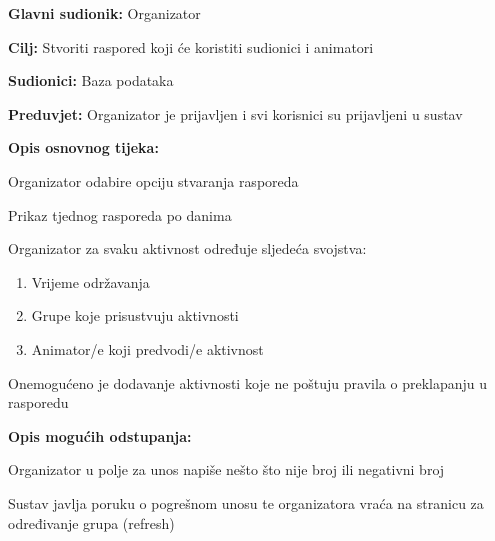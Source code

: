 \noindent {}
\begin{packed_item}

	\item \textbf{Glavni sudionik: }Organizator
	\item  \textbf{Cilj:} Stvoriti raspored koji će koristiti sudionici i animatori
	\item  \textbf{Sudionici:} Baza podataka
	\item  \textbf{Preduvjet:} Organizator je prijavljen i svi korisnici su prijavljeni u sustav
	\item  \textbf{Opis osnovnog tijeka:}

	\item[] \begin{packed_enum}

				\item Organizator odabire opciju stvaranja rasporeda
				\item Prikaz tjednog rasporeda po danima
				\item Organizator za svaku aktivnost određuje sljedeća svojstva:

				\begin{enumerate}
					\item Vrijeme održavanja
					\item Grupe koje prisustvuju aktivnosti
					\item Animator/e koji predvodi/e aktivnost
				\end{enumerate}
				\item Onemogućeno je dodavanje aktivnosti koje ne poštuju pravila o preklapanju u rasporedu

	\end{packed_enum}

	\item  \textbf{Opis mogućih odstupanja:}

	\item[] \begin{packed_item}

				\item[2.a] Organizator u polje za unos napiše nešto što nije broj ili negativni broj
				\item[] \begin{packed_enum}

							\item Sustav javlja poruku o pogrešnom unosu te organizatora vraća na          stranicu za određivanje grupa (refresh)




\end{packed_enum}
\end{packed_item}
\end{packed_item}
